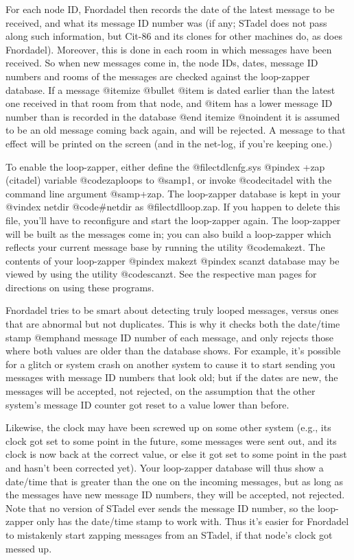 For each node ID, Fnordadel then records the date of the latest message to be
received, and what its message ID number was (if any; STadel does not pass
along such information, but Cit-86 and its clones for other machines
do, as does Fnordadel).  Moreover, this is done in each room
in which messages have been received.  So
when new messages come in, the node IDs, dates, message ID numbers
and rooms of the
messages are checked against the loop-zapper database.  If a
message
@itemize @bullet
@item
is dated earlier than the latest one received in that room
from that node, and
@item
has a lower message ID number than is recorded in the database
@end itemize
@noindent
it is assumed to be an old message coming back again, and will be rejected.
A message to that
effect will be printed on the screen (and in the net-log, if you're
keeping one.)

To enable the loop-zapper, either define the @file{ctdlcnfg.sys}
@pindex +zap (citadel)
variable @code{zaploops} to @samp{1}, or invoke @code{citadel} with the command
line argument @samp{+zap}.  The loop-zapper database is kept in your
@vindex netdir
@code{#netdir} as @file{ctdlloop.zap}.  If you happen to delete this file,
you'll have to reconfigure and start the loop-zapper again.  The
loop-zapper will be built as the messages come in; you can also
build a loop-zapper which reflects your current message base by
running the utility @code{makezt}.  The contents of your loop-zapper
@pindex makezt
@pindex scanzt
database may be viewed by using the utility @code{scanzt}.  See the
respective man pages for directions on using these programs.

Fnordadel tries to be smart about detecting truly looped
messages, versus ones that are abnormal but not duplicates.  This is
why it checks both the date/time stamp @emph{and} message ID number of each
message, and only rejects those where both values are older than
the database shows.  For example, it's possible for a glitch or system crash on
another system to cause it to start sending you messages with
message ID numbers that look old; but if
the dates are new, the messages will be accepted, not rejected, on the
assumption that the other system's message ID counter got reset to a value
lower than before.

Likewise, the clock may have been screwed up on some other system (e.g., its
clock got set to some point in the future, some messages were sent out, and
its clock is now back at the correct
value, or else it got set to some point in the past and hasn't been
corrected yet).  Your loop-zapper database will thus show a date/time
that is greater than the one on the incoming messages, but as long as
the messages have new message ID numbers, they will be accepted, not rejected.
Note that no version of STadel ever sends the message ID number, so
the loop-zapper only has the date/time stamp to work with.  Thus it's
easier for Fnordadel to mistakenly start zapping messages from an
STadel, if that node's clock got messed up.

